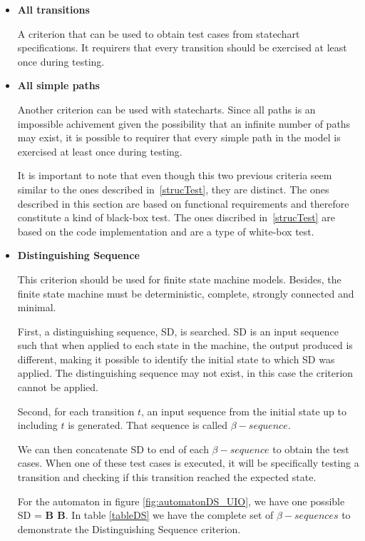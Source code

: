 \begin{itemize}

\item \textbf{All transitions}

A criterion that can be used to obtain test cases from statechart specifications. It requirers that every transition should be exercised at least once during testing.

\item \textbf{All simple paths}

Another criterion can be used with statecharts. Since all paths is an impossible achivement given the possibility that an infinite number of paths may exist, it is possible to requirer that every simple path in the model is exercised at least once during testing.

It is important to note that even though this two previous criteria seem similar to the ones described in~\ref{strucTest}, they are distinct. The ones described in this section are based on functional requirements and therefore constitute a kind of black-box test. The ones discribed in~\ref{strucTest} are based on the code implementation and are a type of white-box test.

\item \textbf{Distinguishing Sequence}

This criterion should be used for finite state machine models. Besides, the finite state machine must be deterministic, complete, strongly connected and minimal. 

First, a distinguishing sequence, SD, is searched. SD is an input sequence such that when applied to each state in the machine, the output produced is different, making it possible to identify the initial state to which SD was applied. The distinguishing sequence may not exist, in this case the criterion cannot be applied.

Second, for each transition $t$, an input sequence from the initial state up to including $t$ is generated. That sequence is called $\beta-sequence$.

We can then concatenate SD to end of each $\beta-sequence$ to obtain the test cases. When one of these test cases is executed, it will be specifically testing a transition and checking if this transition reached the expected state.

For the automaton in figure \ref{fig:automatonDS_UIO}, we have one possible SD = \textbf{B B}. In table \ref{tableDS} we have the complete set of $\beta-sequences$ to demonstrate the Distinguishing Sequence criterion.



\end{itemize}
